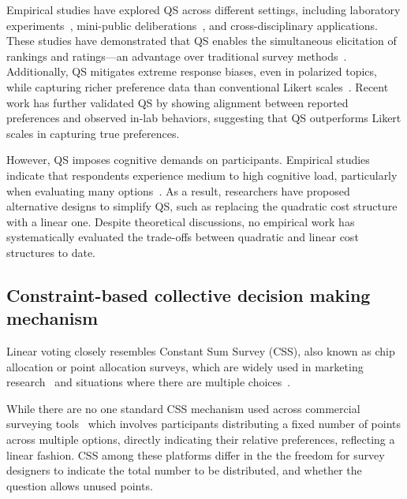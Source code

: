 Empirical studies have explored QS across different settings, including laboratory experiments~\cite{}, mini-public deliberations~\cite{}, and cross-disciplinary applications. These studies have demonstrated that QS enables the simultaneous elicitation of rankings and ratings—an advantage over traditional survey methods~\cite{chengCanShowWhat2021}. Additionally, QS mitigates extreme response biases, even in polarized topics, while capturing richer preference data than conventional Likert scales~\cite{quarfoot2017quadratic, cavaille2024cares, chengCanShowWhat2021, naylor2017first}. Recent work has further validated QS by showing alignment between reported preferences and observed in-lab behaviors, suggesting that QS outperforms Likert scales in capturing true preferences.

However, QS imposes cognitive demands on participants. Empirical studies indicate that respondents experience medium to high cognitive load, particularly when evaluating many options~\cite{cavaille2024cares, chengCanShowWhat2021}. As a result, researchers have proposed alternative designs to simplify QS, such as replacing the quadratic cost structure with a linear one. Despite theoretical discussions, no empirical work has systematically evaluated the trade-offs between quadratic and linear cost structures to date.

\subsection{Constraint-based collective decision making mechanism}
\label{sec:related_works_css}
Linear voting closely resembles Constant Sum Survey (CSS), also known as chip allocation or point allocation surveys, which are widely used in marketing research~\cite{Malhotra_Naresh_K_2012, smithBasicMarketingResearch2013, Donald_R_Cooper2013-03-05, toepoelSmileysStarsHearts2019, hauserIntensityMeasuresConsumer1980} and situations where there are multiple choices~\cite{zhuSelfestimationWeightParameter1991, harwoodUnderstandingImplicitExplicit2019, hanPatientsPerspectivePsychiatric2024}.

While there are no one standard CSS mechanism used across commercial surveying tools~\cite{qualtricsConstantSumQuestion2025, surveysparrowWhatConstantSum2025, lorraineConstantSumQuestion2022} which involves participants distributing a fixed number of points across multiple options, directly indicating their relative preferences, reflecting a linear fashion. CSS among these platforms differ in the the freedom for survey designers to indicate the total number to be distributed, and whether the question allows unused points.

